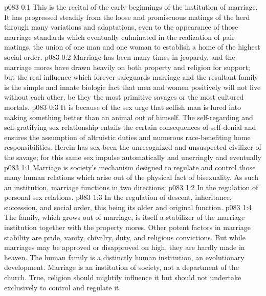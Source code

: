 \author{Chief of Seraphim}
\vs p083 0:1 This is the recital of the early beginnings of the institution of marriage. It has progressed steadily from the loose and promiscuous matings of the herd through many variations and adaptations, even to the appearance of those marriage standards which eventually culminated in the realization of pair matings, the union of one man and one woman to establish a home of the highest social order.
\vs p083 0:2 Marriage has been many times in jeopardy, and the marriage mores have drawn heavily on both property and religion for support; but the real influence which forever safeguards marriage and the resultant family is the simple and innate biologic fact that men and women positively will not live without each other, be they the most primitive savages or the most cultured mortals.
\vs p083 0:3 It is because of the sex urge that selfish man is lured into making something better than an animal out of himself. The self\hyp{}regarding and self\hyp{}gratifying sex relationship entails the certain consequences of self\hyp{}denial and ensures the assumption of altruistic duties and numerous race\hyp{}benefiting home responsibilities. Herein has sex been the unrecognized and unsuspected civilizer of the savage; for this same sex impulse automatically and unerringly  and eventually 
\vs p083 1:1 Marriage is society’s mechanism designed to regulate and control those many human relations which arise out of the physical fact of bisexuality. As such an institution, marriage functions in two directions:
\vs p083 1:2 \bibnobreakspace In the regulation of personal sex relations.
\vs p083 1:3 \bibnobreakspace In the regulation of descent, inheritance, succession, and social order, this being its older and original function.
\vs p083 1:4 \pc The family, which grows out of marriage, is itself a stabilizer of the marriage institution together with the property mores. Other potent factors in marriage stability are pride, vanity, chivalry, duty, and religious convictions. But while marriages may be approved or disapproved on high, they are hardly made in heaven. The human family is a distinctly human institution, an evolutionary development. Marriage is an institution of society, not a department of the church. True, religion should mightily influence it but should not undertake exclusively to control and regulate it.
